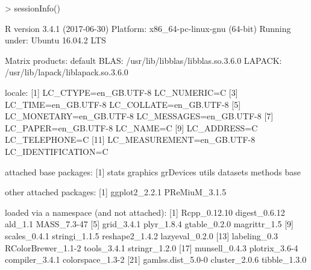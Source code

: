 \documentclass{article}
\begin{document}
\begin{Schunk}
\begin{Sinput}
> sessionInfo()
\end{Sinput}
\begin{Soutput}
R version 3.4.1 (2017-06-30)
Platform: x86_64-pc-linux-gnu (64-bit)
Running under: Ubuntu 16.04.2 LTS

Matrix products: default
BLAS: /usr/lib/libblas/libblas.so.3.6.0
LAPACK: /usr/lib/lapack/liblapack.so.3.6.0

locale:
 [1] LC_CTYPE=en_GB.UTF-8       LC_NUMERIC=C              
 [3] LC_TIME=en_GB.UTF-8        LC_COLLATE=en_GB.UTF-8    
 [5] LC_MONETARY=en_GB.UTF-8    LC_MESSAGES=en_GB.UTF-8   
 [7] LC_PAPER=en_GB.UTF-8       LC_NAME=C                 
 [9] LC_ADDRESS=C               LC_TELEPHONE=C            
[11] LC_MEASUREMENT=en_GB.UTF-8 LC_IDENTIFICATION=C       

attached base packages:
[1] stats     graphics  grDevices utils     datasets  methods   base     

other attached packages:
[1] ggplot2_2.2.1 PReMiuM_3.1.5

loaded via a namespace (and not attached):
 [1] Rcpp_0.12.10       digest_0.6.12      ald_1.1            MASS_7.3-47       
 [5] grid_3.4.1         plyr_1.8.4         gtable_0.2.0       magrittr_1.5      
 [9] scales_0.4.1       stringi_1.1.5      reshape2_1.4.2     lazyeval_0.2.0    
[13] labeling_0.3       RColorBrewer_1.1-2 tools_3.4.1        stringr_1.2.0     
[17] munsell_0.4.3      plotrix_3.6-4      compiler_3.4.1     colorspace_1.3-2  
[21] gamlss.dist_5.0-0  cluster_2.0.6      tibble_1.3.0      
\end{Soutput}
\end{Schunk}



\end{document}
